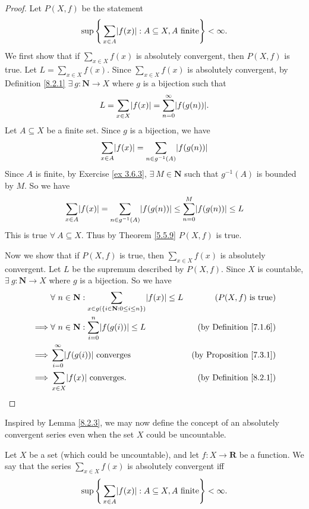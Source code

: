 \begin{proof}
Let \(P(X, f)\) be the statement
\[
    \sup\Bigg\{\sum_{x \in A} \abs*{f(x)} : A \subseteq X, A \text{ finite}\Bigg\} < \infty.
\]
We first show that if \(\sum_{x \in X} f(x)\) is absolutely convergent, then \(P(X, f)\) is true.
Let \(L = \sum_{x \in X} f(x)\).
Since \(\sum_{x \in X} f(x)\) is absolutely convergent, by Definition \ref{8.2.1} \(\exists\ g : \mathbf{N} \to X\) where \(g\) is a bijection such that
\[
    L = \sum_{x \in X} \abs*{f(x)} = \sum_{n = 0}^\infty \abs*{f(g(n))}.
\]
Let \(A \subseteq X\) be a finite set.
Since \(g\) is a bijection, we have
\[
    \sum_{x \in A} \abs*{f(x)} = \sum_{n \in g^{-1}(A)} \abs*{f(g(n))}
\]
Since \(A\) is finite, by Exercise \ref{ex 3.6.3}, \(\exists\ M \in \mathbf{N}\) such that \(g^{-1}(A)\) is bounded by \(M\).
So we have
\[
    \sum_{x \in A} \abs*{f(x)} = \sum_{n \in g^{-1}(A)} \abs*{f(g(n))} \leq \sum_{n = 0}^M \abs*{f(g(n))} \leq L
\]
This is true \(\forall\ A \subseteq X\).
Thus by Theorem \ref{5.5.9} \(P(X, f)\) is true.

Now we show that if \(P(X, f)\) is true, then \(\sum_{x \in X} f(x)\) is absolutely convergent.
Let \(L\) be the supremum described by \(P(X, f)\).
Since \(X\) is countable, \(\exists\ g : \mathbf{N} \to X\) where \(g\) is a bijection.
So we have
\begin{align*}
& \forall\ n \in \mathbf{N} : \sum_{x \in g(\{i \in \mathbf{N} : 0 \leq i \leq n\})} \abs*{f(x)} \leq L & (P(X, f) \text{ is true}) \\
\implies & \forall\ n \in \mathbf{N} : \sum_{i = 0}^n \abs*{f(g(i))} \leq L & \text{(by Definition \ref{7.1.6})} \\
\implies & \sum_{i = 0}^\infty \abs*{f(g(i))} \text{ converges} & \text{(by Proposition \ref{7.3.1})} \\
\implies & \sum_{x \in X} \abs*{f(x)} \text{ converges}. & \text{(by Definition \ref{8.2.1})}
\end{align*}
\end{proof}

\begin{note}
Inspired by Lemma \ref{8.2.3}, we may now define the concept of an absolutely convergent series even when the set \(X\) could be uncountable.
\end{note}

\begin{definition}\label{8.2.4}
Let \(X\) be a set (which could be uncountable), and let \(f : X \to \mathbf{R}\) be a function.
We say that the series \(\sum_{x \in X} f(x)\) is absolutely convergent iff
\[
    \sup\Bigg\{\sum_{x \in A} \abs*{f(x)} : A \subseteq X, A \text{ finite}\Bigg\} < \infty.
\]
\end{definition}

